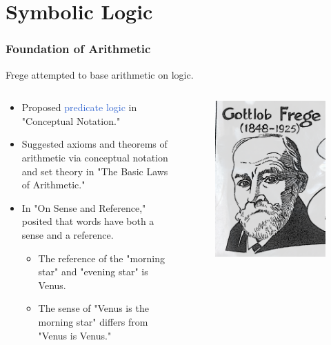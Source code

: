 \documentclass[unicode, 14pt, aspectratio=169]{beamer}
\begin{document}
\section{Symbolic Logic}
\begin{frame}
  \frametitle{Foundation of Arithmetic}
  {\large Frege attempted to base arithmetic on logic.}
  \begin{columns}
    \begin{column}{0.8\textwidth}
      \begin{itemize}
      \item Proposed \textcolor{highlight}{predicate logic} in "Conceptual Notation."
      \item Suggested axioms and theorems of arithmetic via conceptual notation and set theory in "The Basic Laws of Arithmetic."
      \item In "On Sense and Reference," posited that words have both a sense and a reference.
        \begin{itemize}
        \item The reference of the "morning star" and "evening star" is Venus.
        \item The sense of "Venus is the morning star" differs from "Venus is Venus."
        \end{itemize}
      \end{itemize}
    \end{column}    
    \begin{column}{0.2\textwidth}
      \begin{figure}
        \includegraphics[width=1\textwidth]{images/frege.png}

\end{figure}
\end{column}
\end{columns}
\end{frame}
\end{document}
